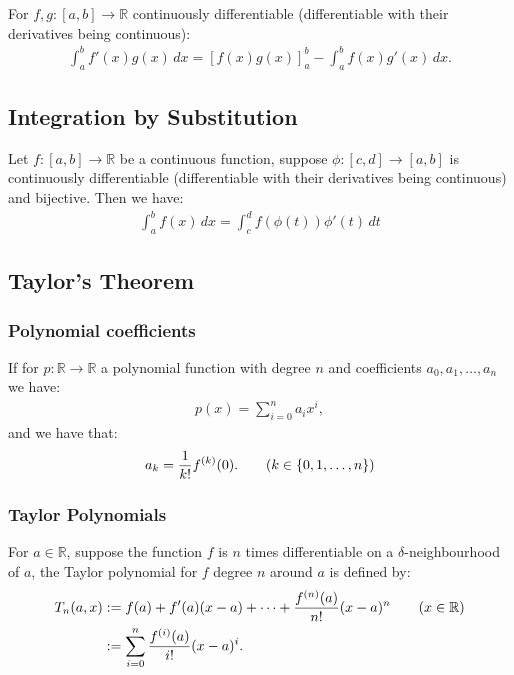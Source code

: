 \documentclass[a4paper, 12pt, twoside]{article}
\begin{document}
For $f, g : [a, b] \to \mathbb{R}$ continuously differentiable (differentiable
with their derivatives being continuous):
\begin{align*}
      \int_a^b f'(x)g(x) \, dx = [f(x)g(x)]_a^b - \int_a^b f(x)g'(x) \, dx.
\end{align*}

\subsection{Integration by Substitution}

Let $f:[a, b] \to \mathbb{R}$ be a continuous function, suppose $\phi:
      [c, d] \to [a, b]$ is continuously differentiable (differentiable
with their derivatives being continuous) and bijective. Then we
have:
\begin{align*}
      \int_a^b f(x) \, dx = \int_c^d f(\phi(t))\phi'(t) \, dt
\end{align*}

\subsection{Taylor's Theorem}

\subsubsection{Polynomial coefficients}

If for $p : \mathbb{R} \to \mathbb{R}$ a polynomial function with degree $n$
and coefficients $a_0, a_1, \ldots, a_n$ we have:
\begin{align*}
      p(x) = \sum_{i = 0}^n a_ix^i,
\end{align*}
and we have that:
\begin{align*}
      a_k = \frac{1}{k!}f^{(k)}(0). \tag{$k \in \{0, 1, \ldots, n\}$}
\end{align*}

\subsubsection{Taylor Polynomials}

For $a \in \mathbb{R}$, suppose the function $f$ is $n$ times differentiable
on a $\delta$-neighbourhood of $a$, the Taylor polynomial for $f$ degree $n$
around $a$ is defined by:
\begin{align*}
      T_n(a, x) & := f(a) + f'(a)(x - a) + \cdots
      + \frac{f^{(n)}(a)}{n!}(x - a)^n \tag{$x \in \mathbb{R}$}     \\
                & := \sum_{i = 0}^n \frac{f^{(i)}(a)}{i!}(x - a)^i.
\end{align*}
\end{document}
